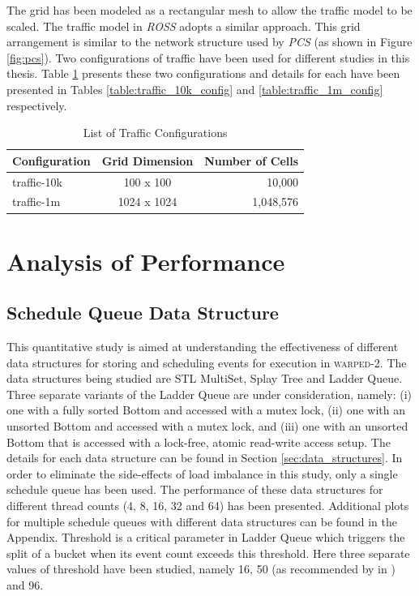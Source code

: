 \documentclass[11pt]{book}
\begin{document}
The grid has been modeled as a rectangular mesh to allow the traffic model to be scaled.  The traffic model in
\emph{ROSS} adopts a similar approach.  This grid arrangement is similar to the network structure used by
\emph{PCS} (as shown in Figure \ref{fig:pcs}).  Two configurations of traffic have been used for different
studies in this thesis.  Table \ref{table:traffic_configs} presents these two configurations and details for
each have been presented in Tables \ref{table:traffic_10k_config} and \ref{table:traffic_1m_config} respectively.

\begin{table}
    \centering
    \begin{tabular}{| l | c | r |}
        \hline
        \textbf{Configuration} & \textbf{Grid Dimension} & \textbf{Number of Cells}\\
        \hline
        traffic-10k     &  100 x 100    & 10,000\\
        traffic-1m      & 1024 x 1024   & 1,048,576\\
        \hline
    \end{tabular}
    \caption{List of Traffic Configurations}\label{table:traffic_configs}
\end{table}


\section{Analysis of Performance}\label{sec:perf_analysis}

\subsection{Schedule Queue Data Structure}\label{subsec:scheduleq_type_plot}

This quantitative study is aimed at understanding the effectiveness of different data structures for storing
and scheduling events for execution in \textsc{warped-2}. The data structures being studied are STL MultiSet,
Splay Tree and Ladder Queue. Three separate variants of the Ladder Queue are under consideration, namely: (i)
one with a fully sorted Bottom and accessed with a mutex lock, (ii) one with an unsorted Bottom and accessed
with a mutex lock, and (iii) one with an unsorted Bottom that is accessed with a lock-free, atomic read-write
access setup.  The details for each data structure can be found in Section \ref{sec:data_structures}. In order
to eliminate the side-effects of load imbalance in this study, only a single schedule queue has been used. The
performance of these data structures for different thread counts (4, 8, 16, 32 and 64) has been
presented. Additional plots for multiple schedule queues with different data structures can be found in the
Appendix. Threshold is a critical parameter in Ladder Queue which triggers the split of a bucket when its
event count exceeds this threshold. Here three separate values of threshold have been studied, namely 16, 50
(as recommended by in \cite{tang-05}) and 96.
\end{document}
